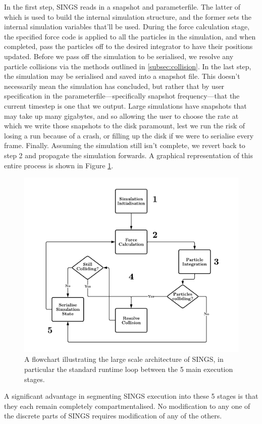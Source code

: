 \documentclass[12pt, twoside, letterpaper]{article}
\begin{document}
In the first step, SINGS reads in a snapshot and parameterfile. The latter of which is used to build the internal simulation structure, and the former sets the internal simulation variables that'll be used. During the force calculation stage, the specified force code is applied to all the particles in the simulation, and when completed, pass the particles off to the desired integrator to have their positions updated. Before we pass off the simulation to be serialised, we resolve any particle collisions via the methods outlined in \ref{subsec:collision}. In the last step, the simulation may be serialised and saved into a snapshot file. This doesn't necessarily mean the simulation has concluded, but rather that by user specification in the parameterfile---specifically snapshot frequency---that the current timestep is one that we output. Large simulations have snapshots that may take up many gigabytes, and so allowing the user to choose the rate at which we write those snapshots to the disk paramount, lest we run the risk of losing a run because of a crash, or filling up the disk if we were to serialise every frame. Finally. Assuming the simulation still isn't complete, we revert back to step 2 and propagate the simulation forwards. A graphical representation of this entire process is shown in Figure \ref{fig:modular}.
\begin{figure}
\caption{A flowchart illustrating the large scale architecture of SINGS, in particular the standard runtime loop between the 5 main execution stages.}
\centerline{\includegraphics[width=.8\textwidth]{Flowchart.pdf}}
\label{fig:modular}
\end{figure}

A significant advantage in segmenting SINGS execution into these 5 stages is that they each remain completely compartmentalised. No modification to any one of the discrete parts of SINGS requires modification of any of the others.
\end{document}
